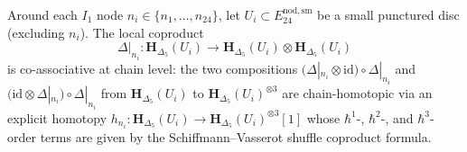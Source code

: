\begin{theorem}
\label{thm:confspaces-co-associativity-nodal-coproduct}
\ClaimStatusConditional
Around each $I_1$ node $n_i\in\{n_1,\ldots,n_{24}\}$, let
$U_i\subset E^{\mathrm{nod,sm}}_{24}$ be a small punctured disc
(excluding $n_i$). The local coproduct
\begin{equation}
\label{eq:confspaces-local-coproduct-at-node}
 \Delta|_{n_i}\colon
 \mathbf{H}_{\Delta_5}(U_i)
 \longrightarrow
 \mathbf{H}_{\Delta_5}(U_i)
 \otimes \mathbf{H}_{\Delta_5}(U_i)
\end{equation}
is co-associative at chain level: the two compositions
$(\Delta|_{n_i}\otimes\mathrm{id})\circ\Delta|_{n_i}$ and
$(\mathrm{id}\otimes\Delta|_{n_i})\circ\Delta|_{n_i}$ from
$\mathbf{H}_{\Delta_5}(U_i)$ to
$\mathbf{H}_{\Delta_5}(U_i)^{\otimes 3}$ are chain-homotopic via an
explicit homotopy $h_{n_i}\colon
\mathbf{H}_{\Delta_5}(U_i)
\to\mathbf{H}_{\Delta_5}(U_i)^{\otimes 3}[1]$
whose $\hbar^1$-, $\hbar^2$-, and $\hbar^3$-order terms are given by
the Schiffmann--Vasserot shuffle coproduct formula.
\end{theorem}

